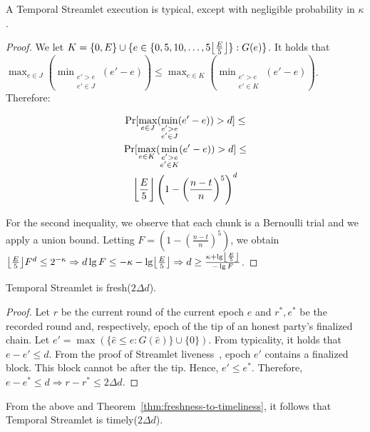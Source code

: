 \begin{lemma} \label{lem:honest-quintuple}
  A Temporal Streamlet execution is typical, except with negligible probability in $\kappa$.
\end{lemma}
\begin{proof}
  We let $K = \{0, E\} \cup \{e \in \{0, 5, 10 ,\ldots, 5\floor*{\frac{E}{5}}\}: G(e)\}$.
  It holds that
  $\max_{e \in J}(\min_{\substack{e' > e \\ e' \in J}}(e' - e)) \leq \max_{e \in K}(\min_{\substack{e' > e \\ e' \in K}}(e' - e))$.
  Therefore:

  \begin{gather*}
      \Pr [\max_{e \in J}(\min_{\substack{e' > e \\ e' \in J}}(e' - e)) > d] \leq \\
      \Pr [\max_{e \in K}(\min_{\substack{e' > e \\ e' \in K}}(e' - e)) > d] \leq \\
      \floor*{\frac{E}{5}} \left(1 - \left(\frac{n - t}{n}\right)^5\right)^d
  \end{gather*}

  For the second inequality, we observe that each chunk is a Bernoulli trial and we
  apply a union bound.
  Letting $F = \left(1 - \left(\frac{n - t}{n}\right)^5\right)$, we obtain
  $\floor*{\frac{E}{5}} F^d \leq 2^{-\kappa} \Rightarrow
   d \lg F \leq -\kappa - \lg \floor*{\frac{E}{5}} \Rightarrow
   d \geq \frac{\kappa + \lg \floor*{\frac{E}{5}}}{- \lg F}
  $.
  \Qed
\end{proof}

\begin{lemma} \label{lem:latest-finalized-round}
  Temporal Streamlet is fresh($2\Delta d$).
\end{lemma}
\begin{proof}
  Let $r$ be the current round of the current epoch $e$
  and $r^*,e^*$ be the recorded round and, respectively, epoch of the tip
  of an honest party's finalized chain.
  Let $e' = \max(\{\hat e \leq e: G(\hat e)\} \cup \{0\})$.
  From typicality, it holds that $e - e' \leq d$.
  From the proof of Streamlet liveness~\cite[Theorem 6]{streamlet}, epoch $e'$ contains a finalized
  block. This block cannot be after the tip.
  Hence, $e' \leq e^*$. Therefore, $e - e^* \leq d \Rightarrow r - r^* \leq 2\Delta d$.
  \Qed
\end{proof}

From the above and Theorem~\ref{thm:freshness-to-timeliness}, it follows that
Temporal Streamlet is timely($2\Delta d$).
